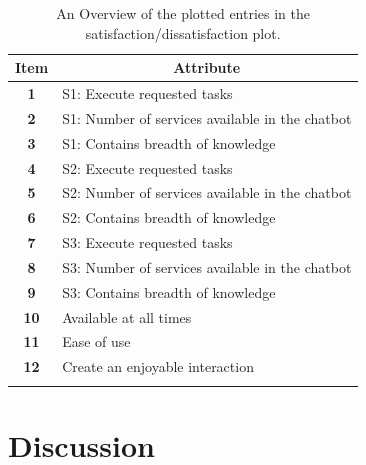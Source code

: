 \begin{longtable}{|c|l|}
	\hline
	\textbf{Item} & \multicolumn{1}{c|}{\textbf{Attribute}}         \\ \hline
	\endfirsthead
	\endhead
	\textbf{1}    & S1: Execute requested tasks                     \\ \hline
	\textbf{2}    & S1: Number of services available in the chatbot \\ \hline
	\textbf{3}    & S1: Contains breadth of knowledge               \\ \hline
	\textbf{4}    & S2: Execute requested tasks                     \\ \hline
	\textbf{5}    & S2: Number of services available in the chatbot \\ \hline
	\textbf{6}    & S2: Contains breadth of knowledge               \\ \hline
	\textbf{7}    & S3: Execute requested tasks                     \\ \hline
	\textbf{8}    & S3: Number of services available in the chatbot \\ \hline
	\textbf{9}    & S3: Contains breadth of knowledge               \\ \hline
	\textbf{10}   & Available at all times                          \\ \hline
	\textbf{11}   & Ease of use                                     \\ \hline
	\textbf{12}   & Create an enjoyable interaction                 \\ \hline
	\caption{An Overview of the plotted entries in the satisfaction/dissatisfaction plot.}
	\label{tab:kanoSatisfactionDissatisfactionTable}
\end{longtable}

\section{Discussion}
